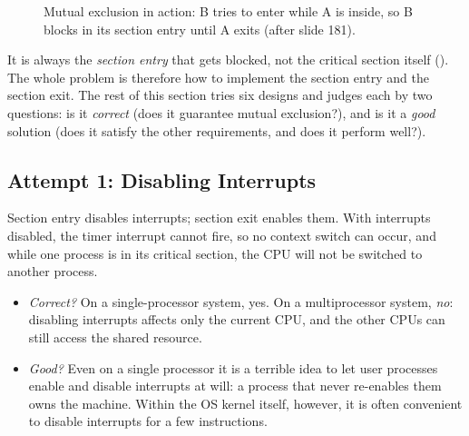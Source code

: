 \begin{figure}[htbp]
\centering
{}
\caption{Mutual exclusion in action: B tries to enter while A is inside, so B blocks in its section entry until A exits (after slide 181).}
\label{fig:csblock}
\end{figure}

It is always the \emph{section entry} that gets blocked, not the critical section itself (). The whole problem is therefore how to implement the section entry and the section exit. The rest of this section tries six designs and judges each by two questions: is it \emph{correct} (does it guarantee mutual exclusion?), and is it a \emph{good} solution (does it satisfy the other requirements, and does it perform well?).

\subsection{Attempt 1: Disabling Interrupts}

Section entry disables interrupts; section exit enables them. With interrupts disabled, the timer interrupt cannot fire, so no context switch can occur, and while one process is in its critical section, the CPU will not be switched to another process.
\begin{itemize}
  \item \emph{Correct?} On a single-processor system, yes. On a multiprocessor system, \emph{no}: disabling interrupts affects only the current CPU, and the other CPUs can still access the shared resource.
  \item \emph{Good?} Even on a single processor it is a terrible idea to let user processes enable and disable interrupts at will: a process that never re-enables them owns the machine. Within the OS kernel itself, however, it is often convenient to disable interrupts for a few instructions.
\end{itemize}

